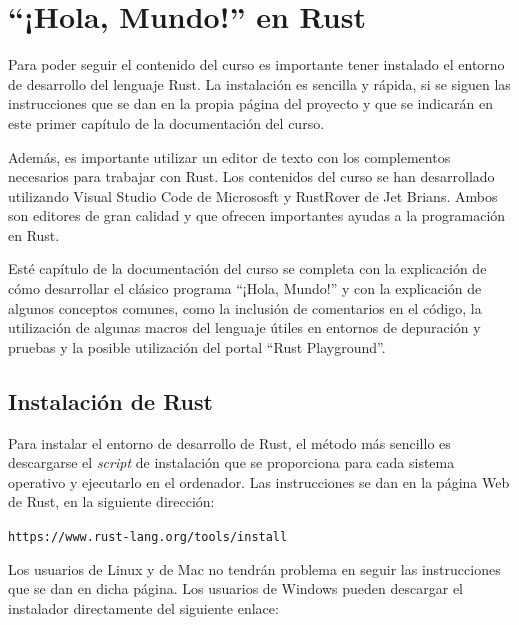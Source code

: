 \chapter{``¡Hola, Mundo!'' en Rust}
\label{ch_hola_mundo}
\IndiceCapitulo

\begin{Resumen}
Para poder seguir el contenido del curso es importante tener instalado el entorno de desarrollo del lenguaje Rust. La instalación es sencilla y rápida, si se siguen las instrucciones que se dan en la propia página del proyecto y que se indicarán en este primer capítulo de la documentación del curso. 

\smallskip

Además, es importante utilizar un editor de texto con los complementos necesarios para trabajar con Rust. Los contenidos del curso se han desarrollado utilizando Visual Studio Code de Micrososft y RustRover de Jet Brians. Ambos son editores de gran calidad y que ofrecen importantes ayudas a la programación en Rust.

\smallskip

Esté capítulo de la documentación del curso se completa con la explicación de cómo desarrollar el clásico programa ``¡Hola, Mundo!'' y con la explicación de algunos conceptos comunes, como la inclusión de comentarios en el código, la utilización de algunas macros del lenguaje útiles en entornos de depuración y pruebas y la posible utilización del portal ``Rust Playground''.
\end{Resumen}

\section{Instalación de Rust}

Para instalar el entorno de desarrollo de Rust, el método más sencillo es descargarse el \textit{script} de instalación que se proporciona para cada sistema operativo y ejecutarlo en el ordenador. Las instrucciones se dan en la página Web de Rust, en la siguiente dirección:

{\centering \small \texttt{https://www.rust-lang.org/tools/install} \par}

Los usuarios de Linux y de Mac no tendrán problema en seguir las instrucciones que se dan en dicha página. Los usuarios de Windows pueden descargar el instalador directamente del siguiente enlace:

